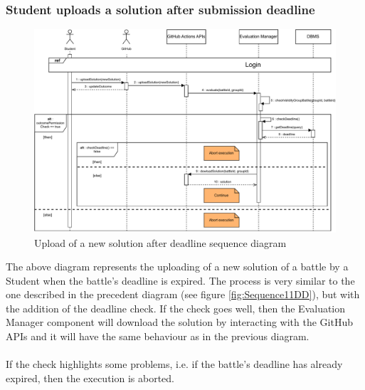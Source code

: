 \documentclass{article}
\begin{document}
{    \subsubsection{Student uploads a solution after submission deadline}
        \begin{figure}[H]
            \centering
            \hspace*{-2.4cm}\includegraphics[scale=0.8]{Sequence/Sequence12DD.pdf}
            \caption{Upload of a new solution after deadline sequence diagram}
            \label{fig:Sequence12DD}
        \end{figure}


        The above diagram represents the uploading of a new solution
        of a battle by a Student when the battle's deadline is expired.
        The process is very similar to the one described in the precedent diagram (see figure
        \ref{fig:Sequence11DD}), but with the addition of the deadline check.
        If the check goes well, then the Evaluation Manager component will download the solution
        by interacting with the GitHub APIs and it will have the same behaviour as in the
        previous diagram.
        \\ \\
        If the check highlights some problems, i.e. if the battle's deadline has already expired,
        then the execution is aborted.

}
\end{document}
